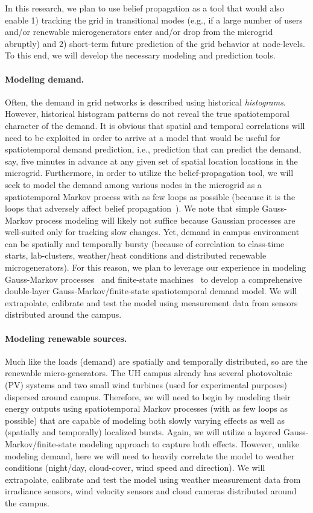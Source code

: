 In this research, we plan to use belief propagation as a tool that would
also enable 1) tracking the grid in transitional modes (e.g., if a large
number of users and/or renewable microgenerators enter and/or drop from the
microgrid abruptly) and 2) short-term future prediction of the grid
behavior at node-levels.  To this end, we will develop the necessary
modeling and prediction tools.

\paragraph{Modeling demand.} Often, the demand in grid networks is
described using historical {\em histograms}. However, historical histogram
patterns do not reveal the true spatiotemporal character of the demand. It
is obvious that spatial and temporal correlations will need to be exploited
in order to arrive at a model that would be useful for spatiotemporal
demand prediction, i.e., prediction that can predict the demand, say, five
minutes in advance at any given set of spatial location locations in the
microgrid.  Furthermore, in order to utilize the belief-propagation tool,
we will seek to model the demand among various nodes in the microgrid as a
spatiotemporal Markov process with as few loops as possible (because it is
the loops that adversely affect belief
propagation~\cite{Wiberg95,Kschischang01,Loeliger07}). We note that simple
Gauss-Markov process modeling will likely not suffice because Gaussian
processes are well-suited only for tracking slow changes.  Yet, demand in
campus environment can be spatially and temporally bursty (because of
correlation to class-time starts, lab-clusters, weather/heat conditions and
distributed renewable microgenerators).  For this reason, we plan to leverage
our experience in modeling Gauss-Markov processes~\cite{Kavcic00a} and
finite-state machines~\cite{Yang05,Vontobel08} to develop a comprehensive
double-layer Gauss-Markov/finite-state spatiotemporal demand model.  We
will extrapolate, calibrate and test the model using measurement data from
sensors distributed around the campus.

\paragraph{Modeling renewable sources.} Much like the loads (demand) are spatially and temporally distributed, so are the renewable micro-generators. The UH campus already has several photovoltaic (PV) systems and two small wind turbines (used for experimental purposes) dispersed around campus.  Therefore, we will need to begin by modeling their energy outputs using spatiotemporal Markov processes (with as few loops as possible) that are capable of modeling both slowly varying effects as well as (spatially and temporally) localized bursts. Again, we will utilize a layered Gauss-Markov/finite-state modeling approach to capture both effects. However, unlike modeling demand, here we will need to heavily correlate the model to weather conditions (night/day, cloud-cover, wind speed and direction). We will extrapolate, calibrate and test the model using weather measurement data from irradiance sensors, wind velocity sensors and cloud cameras distributed around the campus.

